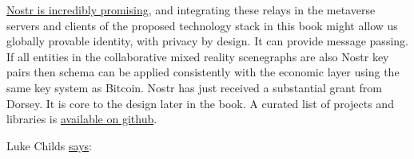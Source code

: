 \href{https://www.forbes.com/sites/rogerhuang/2022/12/29/nostr-is-the-decentralized-protocol-that-might-replace-elon-musks-twitter/}{Nostr is incredibly promising}, and integrating these relays in the metaverse servers and clients of the proposed technology stack in this book might allow us globally provable identity, with privacy by design. It can provide message passing. If all entities in the collaborative mixed reality scenegraphs are also Nostr key pairs then schema can be applied consistently with the economic layer using the same key system as Bitcoin. Nostr has just received a substantial grant from Dorsey. It is core to the design later in the book. A curated list of projects and libraries is \href{https://github.com/aljazceru/awesome-nostr}{available on github}.\par
Luke Childs \href{https://github.com/nostr-protocol/nips/issues/154}{says}:
